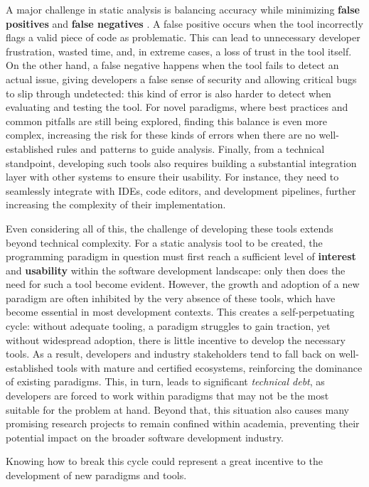 \documentclass[12pt,a4paper,openright,twoside]{book}
\begin{document}
A major challenge in static analysis is balancing accuracy while minimizing
\textbf{false positives} and \textbf{false negatives}
\cite{DBLP:journals/queue/Thomson21}. A false positive occurs when the tool
incorrectly flags a valid piece of code as problematic. This can lead to
unnecessary developer frustration, wasted time, and, in extreme cases, a loss of
trust in the tool itself. On the other hand, a false negative happens when the
tool fails to detect an actual issue, giving developers a false sense of
security and allowing critical bugs to slip through undetected: this kind of
error is also harder to detect when evaluating and testing the tool.
%
For novel paradigms, where best practices and common pitfalls are still being
explored, finding this balance is even more complex, increasing the risk for
these kinds of errors when there are no well-established rules and patterns to
guide analysis.
%
Finally, from a technical standpoint, developing such tools also requires
building a substantial integration layer with other systems to ensure their
usability. For instance, they need to seamlessly integrate with \acp{IDE}, code
editors, and development pipelines, further increasing the complexity of their
implementation.

Even considering all of this, the challenge of developing these tools extends
beyond technical complexity. For a static analysis tool to be created, the
programming paradigm in question must first reach a sufficient level of
\textbf{interest} and \textbf{usability} within the software development
landscape: only then does the need for such a tool become evident. However, the
growth and adoption of a new paradigm are often inhibited by the very absence of
these tools, which have become essential in most development contexts. This
creates a self-perpetuating cycle: without adequate tooling, a paradigm
struggles to gain traction, yet without widespread adoption, there is little
incentive to develop the necessary tools.
%
As a result, developers and industry stakeholders tend to fall back on
well-established tools with mature and certified ecosystems, reinforcing the
dominance of existing paradigms. This, in turn, leads to significant
\emph{technical debt}, as developers are forced to work within paradigms that
may not be the most suitable for the problem at hand. Beyond that, this
situation also causes many promising research projects to remain confined within
academia, preventing their potential impact on the broader software development
industry. 

Knowing how to break this cycle could represent a great incentive to the
development of new paradigms and tools.
\end{document}
